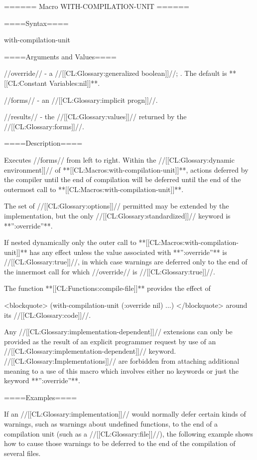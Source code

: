 ====== Macro WITH-COMPILATION-UNIT ======

====Syntax====

\DefmacWithValues with-compilation-unit { } {}


====Arguments and Values====

//override// - a //[[CL:Glossary:generalized boolean]]//; \eval. The default is **[[CL:Constant Variables:nil]]**.

//forms// - an //[[CL:Glossary:implicit progn]]//.

//results// - the //[[CL:Glossary:values]]// returned by the //[[CL:Glossary:forms]]//.

====Description====

Executes //forms// from left to right. Within the //[[CL:Glossary:dynamic environment]]// of **[[CL:Macros:with-compilation-unit]]**, actions deferred by the compiler until the end of compilation will be deferred until the end of the outermost call to **[[CL:Macros:with-compilation-unit]]**.

The set of //[[CL:Glossary:options]]// permitted may be extended by the implementation, but the only //[[CL:Glossary:standardized]]// keyword is **'':override''**.

If nested dynamically only the outer call to **[[CL:Macros:with-compilation-unit]]** has any effect unless the value associated with **'':override''** is //[[CL:Glossary:true]]//, in which case warnings are deferred only to the end of the innermost call for which //override// is //[[CL:Glossary:true]]//.

The function **[[CL:Functions:compile-file]]** provides the effect of

<blockquote> (with-compilation-unit (:override nil) ...) </blockquote> around its //[[CL:Glossary:code]]//.

Any //[[CL:Glossary:implementation-dependent]]// extensions can only be provided as the result of an explicit programmer request by use of an //[[CL:Glossary:implementation-dependent]]// keyword. //[[CL:Glossary:Implementations]]// are forbidden from attaching additional meaning to a use of this macro which involves either no keywords or just the keyword **'':override''**.

====Examples====

If an //[[CL:Glossary:implementation]]// would normally defer certain kinds of warnings, such as warnings about undefined functions, to the end of a compilation unit (such as a //[[CL:Glossary:file]]//), the following example shows how to cause those warnings to be deferred to the end of the compilation of several files.

